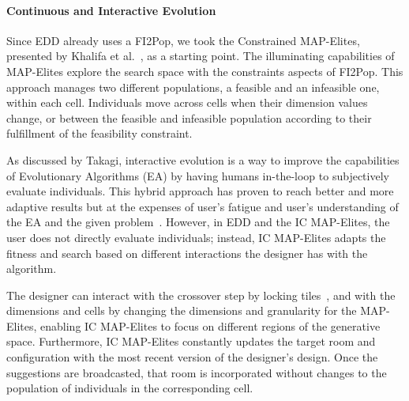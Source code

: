 \paragraph{Continuous and Interactive Evolution}



Since EDD already uses a FI2Pop, we took the Constrained MAP-Elites, presented by Khalifa et al.~\cite{p6Khalifa2018}, as a starting point. The illuminating capabilities of MAP-Elites explore the search space with the constraints aspects of FI2Pop. This approach manages two different populations, a feasible and an infeasible one, within each cell. Individuals move across cells when their dimension values change, or between the feasible and infeasible population according to their fulfillment of the feasibility constraint.

As discussed by Takagi, interactive evolution is a way to improve the capabilities of Evolutionary Algorithms (EA) by having humans in-the-loop to subjectively evaluate individuals. This hybrid approach has proven to reach better and more adaptive results but at the expenses of user's fatigue and user's understanding of the EA and the given problem~\cite{p6Takagi2001-InteractiveEvo}. However, in EDD and the IC MAP-Elites, the user does not directly evaluate individuals; instead, IC MAP-Elites adapts the fitness and search based on different interactions the designer has with the algorithm. 

The designer can interact with the crossover step by locking tiles~\cite{p6Alvarez2018a}, and with the dimensions and cells by changing the dimensions and granularity for the MAP-Elites, enabling IC MAP-Elites to focus on different regions of the generative space. Furthermore, IC MAP-Elites constantly updates the target room and configuration with the most recent version of the designer's design. Once the suggestions are broadcasted, that room is incorporated without changes to the population of individuals in the corresponding cell.

